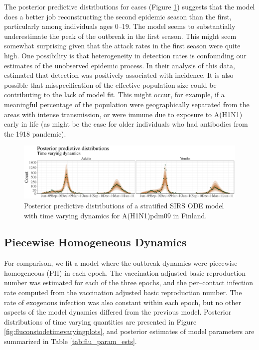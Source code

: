 The posterior predictive distributions for cases (Figure \ref{fig:flupostpredsrwode}) suggests that the model does a better job reconstructing the second epidemic season than the first, particularly among individuals ages 0--19. The model seems to substantially underestimate the peak of the outbreak in the first season. This might seem somewhat surprising given that the attack rates in the first season were quite high. One possibility is that heterogeneity in detection rates is confounding our estimates of the unobserved epidemic process. In their analysis of this data, \cite{shubin2016revealing} estimated that detection was positively associated with incidence. It is also possible that misspecification of the effective population size could be contributing to the lack of model fit. This might occur, for example, if a meaningful percentage of the population were geographically separated from the areas with intense transmission, or were immune due to exposure to A(H1N1) early in life (as might be the case for older individuals who had antibodies from the 1918 pandemic).  

\begin{figure}[htbp]
	\centering
	\includegraphics[width=\linewidth]{figures/flu_postpreds_rw_ode}
	\caption{Posterior predictive distributions of a stratified SIRS ODE model with time varying dynamics for A(H1N1)pdm09 in Finland.}
	\label{fig:flupostpredsrwode}
\end{figure}


\subsection{Piecewise Homogeneous Dynamics}
\label{subsec:flu_res_homog}

For comparison, we fit a model where the outbreak dynamics were piecewise homogeneous (PH) in each epoch. The vaccination adjusted basic reproduction number was estimated for each of the three epochs, and the per--contact infection rate computed from the vaccination adjusted basic reproduction number. The rate of exogenous infection was also constant within each epoch, but no other aspects of the model dynamics differed from the previous model. Posterior distributions of time varying quantities are presented in Figure \ref{fig:fluconstodetimevaryingplots}, and posterior estimates of model parameters are summarized in Table \ref{tab:flu_param_ests}. 

